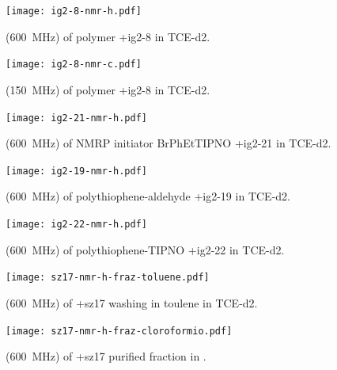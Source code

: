 \begin{figure}%
\centering
\texttt{[image: ig2-8-nmr-h.pdf]}
\caption[{\HNMR} of polymer \cmpd+{ig2-8}.]{{\HNMR} (\SI{600}{\MHz}) of polymer \cmpd+{ig2-8} in \gls{TCE}-d2.}
\label{fig:ig2-8-nmr-h}
\end{figure}

\begin{figure}%
\centering
\texttt{[image: ig2-8-nmr-c.pdf]}
\caption[{\CNMR} of polymer \cmpd+{ig2-8}.]{{\CNMR} (\SI{150}{\MHz}) of polymer \cmpd+{ig2-8} in \gls{TCE}-d2.}
\label{fig:ig2-8-nmr-c}
\end{figure}

\begin{figure}%
\centering
\texttt{[image: ig2-21-nmr-h.pdf]}
\caption[{\HNMR} of NMRP initiator PhEt-TIPNO \cmpd+{ig2-21}.]{{\HNMR} (\SI{600}{\MHz}) of \gls{NMRP} initiator \gls{BrPhEtTIPNO} \cmpd+{ig2-21} in \gls{TCE}-d2.}
\label{fig:ig2-21-nmr-h}
\end{figure}

\begin{figure}%
\centering
\texttt{[image: ig2-19-nmr-h.pdf]}
\caption[{\HNMR} of polythiophene-aldehyde \cmpd+{ig2-19}.]{{\HNMR} (\SI{600}{\MHz}) of polythiophene-aldehyde \cmpd+{ig2-19} in \gls{TCE}-d2.}
\label{fig:ig2-19-nmr-h}
\end{figure}

\begin{figure}%
\centering
\texttt{[image: ig2-22-nmr-h.pdf]}
\caption[{\HNMR} of polythiophene-TIPNO \cmpd+{ig2-22}.]{{\HNMR} (\SI{600}{\MHz}) of polythiophene-TIPNO \cmpd+{ig2-22} in \gls{TCE}-d2.}
\label{fig:ig2-22-nmr-h}
\end{figure}

\begin{figure}%
\centering
\texttt{[image: sz17-nmr-h-fraz-toluene.pdf]}
\caption[{\HNMR} of \cmpd+{sz17} washing in toulene.]{{\HNMR} (\SI{600}{\MHz}) of \cmpd+{sz17} washing in toulene in \gls{TCE}-d2.}
\label{fig:sz17-nmr-h-fraz-toluene}
\end{figure}

\begin{figure}%
\centering
\texttt{[image: sz17-nmr-h-fraz-cloroformio.pdf]}
\caption[{\HNMR} of \cmpd+{sz17} purified fraction.]{{\HNMR} (\SI{600}{\MHz}) of \cmpd+{sz17} purified fraction in .}
\label{fig:sz17-nmr-h-fraz-cloroformio}
\end{figure}

